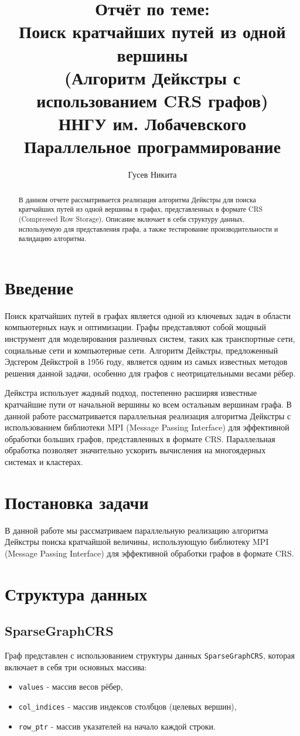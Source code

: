 \documentclass[12pt]{article}
\title{Отчёт по теме: \\ Поиск кратчайших путей из одной вершины \\ (Алгоритм Дейкстры с использованием CRS графов) \\ ННГУ им. Лобачевского \\ Параллельное программирование}
\author{Гусев Никита}
\begin{document}
\maketitle
\begin{abstract}
    В данном отчете рассматривается реализация алгоритма Дейкстры для поиска кратчайших путей из одной вершины в графах, представленных в формате CRS (Compressed Row Storage). Описание включает в себя структуру данных, используемую для представления графа, а также тестирование производительности и валидацию алгоритма. 
\end{abstract}
\newpage
\tableofcontents
\newpage

\section{Введение}
Поиск кратчайших путей в графах является одной из ключевых задач в области компьютерных наук и оптимизации. Графы представляют собой мощный инструмент для моделирования различных систем, таких как транспортные сети, социальные сети и компьютерные сети. Алгоритм Дейкстры, предложенный Эдсгером Дейкстрой в 1956 году, является одним из самых известных методов решения данной задачи, особенно для графов с неотрицательными весами рёбер.

Дейкстра использует жадный подход, постепенно расширяя известные кратчайшие пути от начальной вершины ко всем остальным вершинам графа. В данной работе рассматривается параллельная реализация алгоритма Дейкстры с использованием библиотеки MPI (Message Passing Interface) для эффективной обработки больших графов, представленных в формате CRS. Параллельная обработка позволяет значительно ускорить вычисления на многоядерных системах и кластерах.

\newpage
\section{Постановка задачи}
В данной работе мы рассматриваем параллельную реализацию алгоритма Дейкстры поиска кратчайшой величины, использующую библиотеку MPI (Message Passing Interface) для эффективной обработки графов в формате CRS.
\newpage
\section{Структура данных}
\subsection{SparseGraphCRS}
Граф представлен с использованием структуры данных \texttt{SparseGraphCRS}, которая включает в себя три основных массива:
\begin{itemize}
    \item \texttt{values} - массив весов рёбер,
    \item \texttt{col\_indices} - массив индексов столбцов (целевых вершин),
    \item \texttt{row\_ptr} - массив указателей на начало каждой строки.
\end{itemize}
\end{document}
